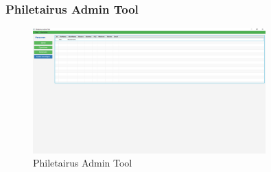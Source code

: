 \begin{frame}
\frametitle{Philetairus Admin Tool}

\begin{figure}
  \includegraphics[width=0.8\textwidth]{figures/phileadmin.png}
  \caption{Philetairus Admin Tool}
  \label{fig:phileadmin}
\end{figure}

\end{frame}




